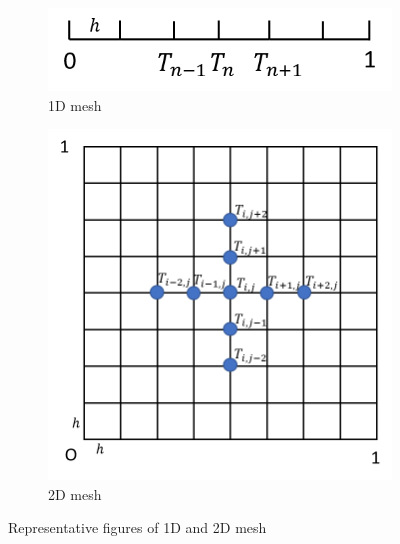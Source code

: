 \documentclass{article}
\begin{document}
\begin{figure}
    \centering
    \begin{subfigure}{.5\textwidth}
        \centering
        \includegraphics[width=0.9\linewidth]{1d_mesh.png}
        \caption{1D mesh}
    \end{subfigure}%
    \begin{subfigure}{.5\textwidth}
        \centering
        \includegraphics[width=0.9\linewidth]{2d_mesh.png}
        \caption{2D mesh}
    \end{subfigure}
    \caption{Representative figures of 1D and 2D mesh}
\end{figure}

\end{document}
